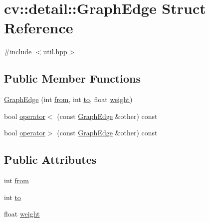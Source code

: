 \hypertarget{structcv_1_1detail_1_1GraphEdge}{\section{cv\-:\-:detail\-:\-:Graph\-Edge Struct Reference}
\label{structcv_1_1detail_1_1GraphEdge}
}


{\ttfamily \#include $<$util.\-hpp$>$}

\subsection*{Public Member Functions}
\begin{DoxyCompactItemize}
\item 
\hyperlink{structcv_1_1detail_1_1GraphEdge_a7de758260f93bd840c47184aef9b25a2}{Graph\-Edge} (int \hyperlink{structcv_1_1detail_1_1GraphEdge_ac4e43b1421e87ba73232f9d502925b49}{from}, int \hyperlink{structcv_1_1detail_1_1GraphEdge_a7ee67c4025576238d703f2b51bdcaa51}{to}, float \hyperlink{structcv_1_1detail_1_1GraphEdge_a9efad8a7b27a03e6029a75413aed60ae}{weight})
\item 
bool \hyperlink{structcv_1_1detail_1_1GraphEdge_a5b07b9fa616a48cdda17b8f81e38f241}{operator$<$} (const \hyperlink{structcv_1_1detail_1_1GraphEdge}{Graph\-Edge} \&other) const 
\item 
bool \hyperlink{structcv_1_1detail_1_1GraphEdge_a25bc7c2b22d44d178657c20f2a463cd9}{operator$>$} (const \hyperlink{structcv_1_1detail_1_1GraphEdge}{Graph\-Edge} \&other) const 
\end{DoxyCompactItemize}
\subsection*{Public Attributes}
\begin{DoxyCompactItemize}
\item 
int \hyperlink{structcv_1_1detail_1_1GraphEdge_ac4e43b1421e87ba73232f9d502925b49}{from}
\item 
int \hyperlink{structcv_1_1detail_1_1GraphEdge_a7ee67c4025576238d703f2b51bdcaa51}{to}
\item 
float \hyperlink{structcv_1_1detail_1_1GraphEdge_a9efad8a7b27a03e6029a75413aed60ae}{weight}
\end{DoxyCompactItemize}


